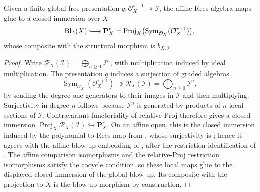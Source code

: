 \begin{lemma}
  \label{lemma:nagata-global-blowup-relative-projective-embedding}

  Given a finite global free presentation
  \(q\colon\mathcal O_X^{r+1}\twoheadrightarrow\mathcal I\), the affine
  Rees-algebra maps glue to a closed immersion over \(X\)
  \[
    \operatorname{Bl}_{\mathcal I}(X)
      \lhook\joinrel\longrightarrow
    \mathbf P^r_X
      =\operatorname{Proj}_X
        \bigl(\operatorname{Sym}_{\mathcal O_X}(\mathcal O_X^{r+1})\bigr),
  \]
  whose composite with the structural morphism is \(b_{X,\mathcal I}\).
\end{lemma}

\begin{proof}
  Write \(\mathcal R_X(\mathcal I)=\bigoplus_{n\geq0}\mathcal I^n\), with
  multiplication induced by ideal multiplication.  The presentation \(q\)
  induces a surjection of graded algebras
  \[
    \operatorname{Sym}_{\mathcal O_X}(\mathcal O_X^{r+1})
      \twoheadrightarrow
    \mathcal R_X(\mathcal I)=\bigoplus_{n\geq0}\mathcal I^n,
  \]
  by sending the degree-one generators to their images in \(\mathcal I\) and
  then multiplying.  Surjectivity in degree \(n\) follows because
  \(\mathcal I^n\) is generated by products of \(n\) local sections of
  \(\mathcal I\).  Contravariant functoriality of relative Proj therefore
  gives a closed immersion
  \(\operatorname{Proj}_X\mathcal R_X(\mathcal I)\hookrightarrow\mathbf P^r_X\).
  On an affine open, this is the closed immersion induced by the
  polynomial-to-Rees map from
  , whose surjectivity is
  ; hence it agrees with the affine blow-up
  embedding of , after
  the restriction identification of .
  The affine
  comparison isomorphisms and the relative-Proj restriction isomorphisms
  satisfy the cocycle condition, so these local maps glue to the displayed
  closed immersion of the global blow-up.  Its composite with the projection
  to \(X\) is the blow-up morphism by construction.
\end{proof}

